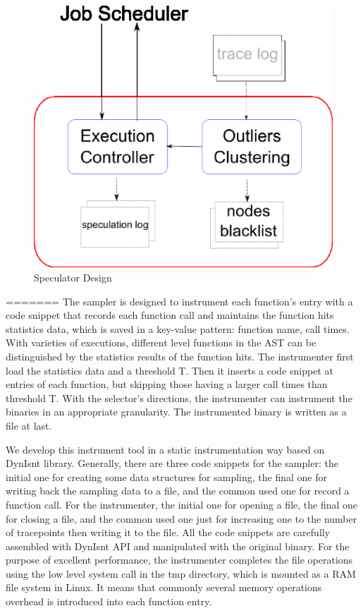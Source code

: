 \begin{figure}
\centering
\includegraphics[width=0.9\columnwidth]{figures/speculator.eps}
\caption{Speculator Design}
\label{figure:speculator}
\end{figure}
=======
The sampler is designed to instrument each function’s entry with a code snippet that records each function call and maintains the function hits statistics data, which is saved in a key-value pattern: function name, call times. With varieties of executions, different level functions in the AST can be distinguished by the statistics results of the function hits. The instrumenter first load the statistics data and a threshold T. Then it inserts a code snippet at entries of each function, but skipping those having a larger call times than threshold T. With the selector's directions, the instrumenter can instrument the binaries in an appropriate granularity. The instrumented binary is written as a file at last. 

We develop this instrument tool in a static instrumentation way based on DynIsnt library. Generally, there are three code snippets for the sampler: the initial one for creating some data structures for sampling, the final one for writing back the sampling data to a file, and the common used one for record a function call. For the instrumenter, the initial one for opening a file, the final one for closing a file, and the common used one just for increasing one to the number of tracepoints then writing it to the file. All the code snippets are carefully assembled with DynIsnt API and manipulated with the original binary. For the purpose of excellent performance, the instrumenter completes the file operations using the low level system call in the tmp directory, which is mounted as a RAM file system in Linux. It means that commonly several memory operations overhead is introduced into each function entry.


